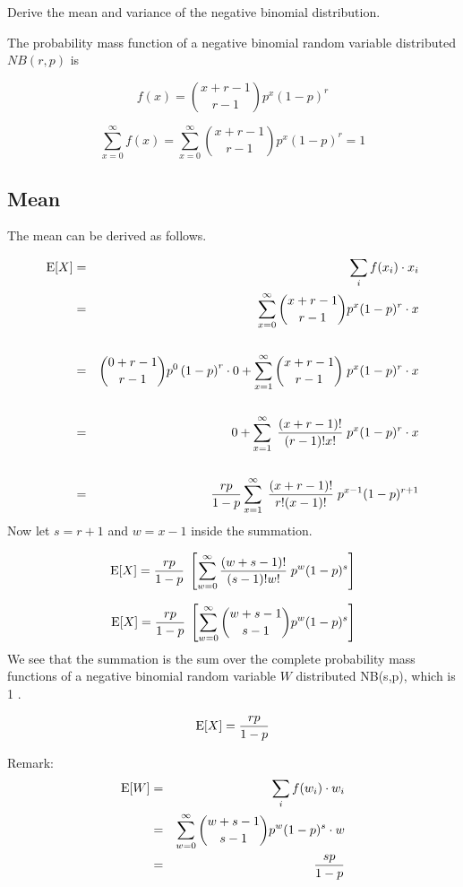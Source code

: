 \documentclass[a4paper,12pt]{article}
\begin{document}
\Large 
\noindent Derive the mean and variance of the negative binomial distribution.
\begin{framed}
\noindent The probability mass function of a negative binomial random variable distributed $NB(r,p)$ is

\[f(x) = {x+r-1 \choose r-1} p^x (1-p)^r \]
\end{framed}
\medskip
\begin{framed}
\[\sum^{\infty}_{x=0} f(x) = \sum^{\infty}_{x=0}{x+r-1 \choose r-1} p^x (1-p)^r  = 1\]
\end{framed}
\subsection*{Mean}
The mean can be derived as follows.

\begin{eqnarray*}
\operatorname{E}[X] &=& \sum_i f(x_i)  \cdot x_i \\
&=& \sum_{x=0}^\infty  {x+r-1 \choose r-1} p^x (1-p)^r  \cdot  x\\
& & \\
&=& {0+r-1 \choose r-1} p^0 \left(1-p\right)^r  \cdot  0 +  \sum_{x=1}^\infty  {x+r-1 \choose r-1} \;p^x (1-p)^r  \cdot  x\\
& & \\
&=& 0 +  \sum_{x=1}^\infty \; {(x+r-1)! \over (r-1)!x!} \;p^x (1-p)^r  \cdot  x\\
& & \\
&=& {rp \over 1-p}\sum_{x=1}^\infty \; {(x+r-1)! \over r!(x-1)!} \;p^{x-1} (1-p)^{r+1}\\
\end{eqnarray*}
\newpage 
Now let $s = r+1$ and $w=x-1$ inside the summation.

\[\operatorname{E}[X] = {rp \over 1-p}\; \left[\sum_{w=0}^\infty  {(w+s-1)! \over (s-1)!w!} \;p^w (1-p)^s  \right] \]

\[\operatorname{E}[X] = {rp \over 1-p}\; \left[\sum_{w=0}^\infty  {w+s-1 \choose s-1} p^w (1-p)^s \right] \]
\smallskip 
\noindent We see that the summation is the sum over the complete probability mass functions of a negative binomial random variable $W$ distributed NB(s,p), which is 1 .%

\[\operatorname{E}[X] = {rp \over 1-p}\]

\begin{framed}
Remark:
\begin{eqnarray*}
\operatorname{E}[W] &=& \sum_i f(w_i)  \cdot w_i \\
&=& \sum_{w=0}^\infty  {w+s-1 \choose s-1} p^w (1-p)^s  \cdot  w\\
&=& {sp \over 1-p}\\
\end{eqnarray*}
\end{framed}
\newpage 
\end{document}
